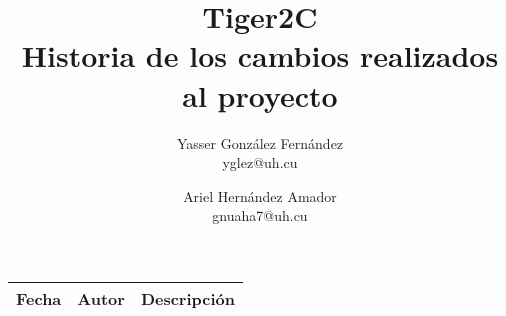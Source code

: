 \documentclass{article}
\title{
	\LARGE{Tiger2C} \\
	\Large{Historia de los cambios realizados al proyecto}
}
\author{
  	Yasser González Fernández \\
  	\small{yglez@uh.cu}
  	\and
  	Ariel Hernández Amador \\
  	\small{gnuaha7@uh.cu}
}
\date{}
\begin{document}
\maketitle

\thispagestyle{empty}

\newpage

\setcounter{page}{1}

\begin{center}
\begin{longtable}{|l|l|p{20em}|}
\hline 
\textbf{Fecha} & \textbf{Autor} & \textbf{Descripción} \\
\hline

\end{longtable}
\end{center}
\end{document}
